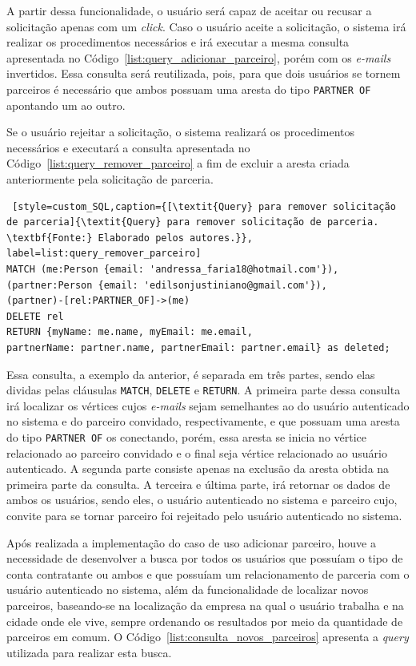 \par A partir dessa funcionalidade, o usuário será capaz de aceitar ou recusar a solicitação apenas com um \textit{click}. Caso o usuário aceite a solicitação, o sistema irá realizar os procedimentos necessários e irá executar a mesma consulta apresentada no Código~\ref{list:query_adicionar_parceiro}, porém com os \textit{e-mails} invertidos. Essa consulta será reutilizada, pois, para que dois usuários se tornem parceiros é necessário que ambos possuam uma aresta do tipo \texttt{PARTNER OF} apontando um ao outro.

\par Se o usuário rejeitar a solicitação, o sistema realizará os procedimentos necessários e executará a consulta apresentada no Código~\ref{list:query_remover_parceiro} a fim de excluir a aresta criada anteriormente pela solicitação de parceria.

\begin{lstlisting} [style=custom_SQL,caption={[\textit{Query} para remover solicitação de parceria]{\textit{Query} para remover solicitação de parceria. \textbf{Fonte:} Elaborado pelos autores.}}, label=list:query_remover_parceiro] 	
MATCH (me:Person {email: 'andressa_faria18@hotmail.com'}),
(partner:Person {email: 'edilsonjustiniano@gmail.com'}),
(partner)-[rel:PARTNER_OF]->(me)
DELETE rel
RETURN {myName: me.name, myEmail: me.email, 
partnerName: partner.name, partnerEmail: partner.email} as deleted;
\end{lstlisting}

\par Essa consulta, a exemplo da anterior, é separada em três partes, sendo elas dividas pelas cláusulas \texttt{MATCH}, \texttt{DELETE} e \texttt{RETURN}. A primeira parte dessa consulta irá localizar os vértices cujos \textit{e-mails} sejam semelhantes ao do usuário autenticado no sistema e do parceiro convidado, respectivamente, e que possuam uma aresta do tipo \texttt{PARTNER OF} os conectando, porém, essa aresta se inicia no vértice relacionado ao parceiro convidado e o final seja vértice relacionado ao usuário autenticado. A segunda parte consiste apenas na exclusão da aresta obtida na primeira parte da consulta. A terceira e última parte, irá retornar os dados de ambos os usuários, sendo eles, o usuário autenticado no sistema e parceiro cujo, convite para se tornar parceiro foi rejeitado pelo usuário autenticado no sistema.

\par Após realizada a implementação do caso de uso adicionar parceiro, houve a necessidade de desenvolver a busca por todos os usuários que possuíam o tipo de conta contratante ou ambos e que possuíam um relacionamento de parceria com o usuário autenticado no sistema, além da funcionalidade de localizar novos parceiros, baseando-se na localização da empresa na qual o usuário trabalha e na cidade onde ele vive, sempre ordenando os resultados por meio da quantidade de parceiros em comum. O Código~\ref{list:consulta_novos_parceiros} apresenta a \textit{query} utilizada para realizar esta busca.

